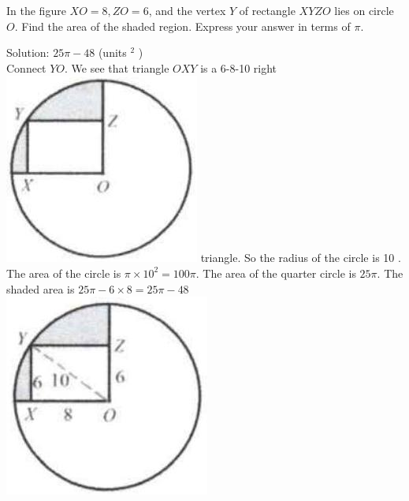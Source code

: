 \documentclass{article}
\begin{document}
In the figure \(X O=8, Z O=6\), and the vertex \(Y\) of rectangle \(X Y Z O\) lies on circle \(O\). Find the area of the shaded region. Express your answer in terms of \(\pi\).

Solution: \(25 \pi-48\) (units \({ }^{2}\) )\\
Connect \(Y O\). We see that triangle \(O X Y\) is a 6-8-10 right\\
\includegraphics[width=\textwidth]{images/150.jpg} triangle. So the radius of the circle is 10 . The area of the circle is \(\pi \times 10^{2}=100 \pi\). The area of the quarter circle is \(25 \pi\). The shaded area is \(25 \pi-6 \times 8=25 \pi-48\)\\
\centering
\includegraphics[width=\textwidth]{images/150(3).jpg}
\end{document}
